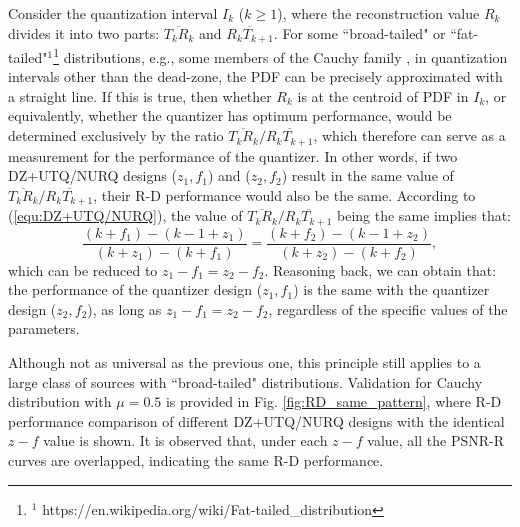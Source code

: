 \documentclass[smallabstract,smallcaptions]{dccpaper}
\begin{document}
Consider the quantization interval $I_k$ ($k \ge 1$), where the reconstruction value $R_k$ divides it into two parts: $\overline{T_k R_k}$ and $\overline{R_k T_{k+1}}$. For some ``broad-tailed" or ``fat-tailed"$^1$\footnote{$^1$ https://en.wikipedia.org/wiki/Fat-tailed\_distribution} distributions, e.g., some members of the Cauchy family \cite{Farvardin_TIT1984}, in quantization intervals other than the dead-zone, the PDF can be precisely approximated with a straight line. If this is true, then whether $R_k$ is at the centroid of PDF in $I_k$, or equivalently, whether the quantizer has optimum performance, would be determined exclusively by the ratio $\overline{T_k R_k} / \overline{R_k T_{k+1}}$, which therefore can serve as a measurement for the performance of the quantizer. In other words, if two DZ+UTQ/NURQ designs ($z_1, f_1$) and ($z_2, f_2$) result in the same value of $\overline{T_k R_k} / \overline{R_k T_{k+1}}$, their R-D performance would also be the same. According to (\ref{equ:DZ+UTQ/NURQ}), the value of $\overline{T_k R_k} / \overline{R_k T_{k+1}}$ being the same implies that:
\begin{equation}\label{equ:formula-ratio}
\frac{(k+f_1)-(k-1+z_1)}{(k+z_1)-(k+f_1)} = \frac{(k+f_2)-(k-1+z_2)}{(k+z_2)-(k+f_2)},
\end{equation}
which can be reduced to $z_1 - f_1 = z_2 - f_2$. Reasoning back, we can obtain that: the performance of the quantizer design ($z_1, f_1$) is the same with the quantizer design ($z_2, f_2$), as long as $z_1 - f_1 = z_2 - f_2$, regardless of the specific values of the parameters.

Although not as universal as the previous one, this principle still applies to a large class of sources with ``broad-tailed" distributions. Validation for Cauchy distribution with $\mu = 0.5$ is provided in Fig. \ref{fig:RD_same_pattern}, where R-D performance comparison of different DZ+UTQ/NURQ designs with the identical $z-f$ value is shown. It is observed that, under each $z-f$ value, all the PSNR-R curves are overlapped, indicating the same R-D performance.
\end{document}
